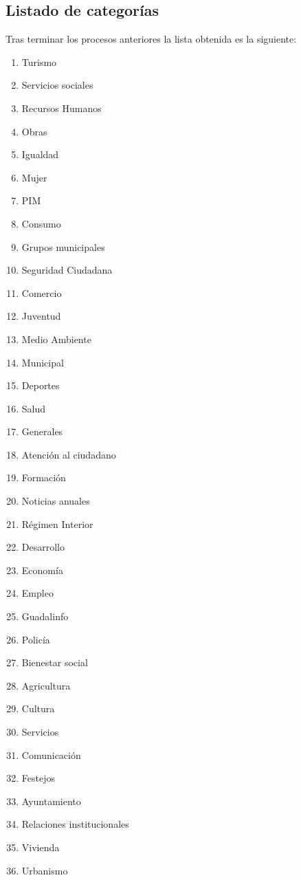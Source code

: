 \subsection{Listado de categorías}
\label{subsec:listacat}
Tras terminar los procesos anteriores la lista obtenida es la siguiente:
\begin{multicols}{3}
\begin{enumerate}
    \item Turismo
    \item Servicios sociales
    \item Recursos Humanos
    \item Obras
    \item Igualdad
    \item Mujer
    \item PIM
    \item Consumo
    \item Grupos municipales
    \item Seguridad Ciudadana
    \item Comercio
    \item Juventud
    \item Medio Ambiente
    \item Municipal
    \item Deportes
    \item Salud
    \item Generales
    \item Atención al ciudadano
    \item Formación
    \item Noticias anuales
    \item Régimen Interior
    \item Desarrollo
    \item Economía
    \item Empleo
    \item Guadalinfo
    \item Policía
    \item Bienestar social
    \item Agricultura
    \item Cultura
    \item Servicios
    \item Comunicación
    \item Festejos
    \item Ayuntamiento
    \item Relaciones institucionales
    \item Vivienda
    \item Urbanismo

\end{enumerate}
\end{multicols}
